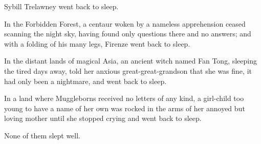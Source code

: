 Sybill Trelawney went back to sleep.

In the Forbidden Forest, a centaur woken by a nameless apprehension ceased scanning the night sky, having found only questions there and no answers; and with a folding of his many legs, Firenze went back to sleep.

In the distant lands of magical Asia, an ancient witch named Fan Tong, sleeping the tired days away, told her anxious great-great-grandson that she was fine, it had only been a nightmare, and went back to sleep.

In a land where Muggleborns received no letters of any kind, a girl-child too young to have a name of her own was rocked in the arms of her annoyed but loving mother until she stopped crying and went back to sleep.

None of them slept well.

